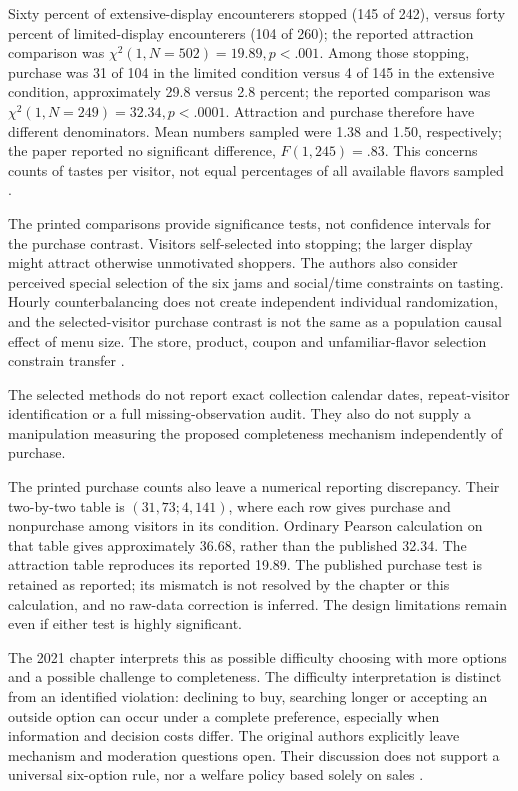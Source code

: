 Sixty percent of extensive-display encounterers stopped (145 of 242),
versus forty percent of limited-display encounterers (104 of 260);
the reported attraction comparison was
\(\chi^2(1,N=502)=19.89,p<.001\). Among those stopping, purchase
was 31 of 104 in the limited condition versus 4 of 145 in the extensive
condition, approximately 29.8 versus 2.8 percent; the reported comparison
was \(\chi^2(1,N=249)=32.34,p<.0001\). Attraction and purchase
therefore have different denominators. Mean numbers sampled were 1.38
and 1.50, respectively; the paper reported no significant difference,
\(F(1,245)=.83\). This concerns counts of tastes per visitor, not equal
percentages of all available flavors sampled
\cite[p.~997]{IyengarLepper2000ChoiceR94}.

The printed comparisons provide significance tests, not confidence intervals
for the purchase contrast. Visitors self-selected into stopping; the larger
display might attract otherwise unmotivated shoppers. The authors also
consider perceived special selection of the six jams and social/time
constraints on tasting. Hourly counterbalancing does not create independent
individual randomization, and the selected-visitor purchase contrast is
not the same as a population causal effect of menu size. The store,
product, coupon and unfamiliar-flavor selection constrain transfer
\cite[pp.~997--998, 1003--1004]{IyengarLepper2000ChoiceR94}.

The selected methods do not report exact collection calendar dates,
repeat-visitor identification or a full missing-observation audit. They
also do not supply a manipulation measuring the proposed completeness
mechanism independently of purchase.

The printed purchase counts also leave a numerical reporting discrepancy.
Their two-by-two table is \((31,73;4,141)\), where each row gives
purchase and nonpurchase among visitors in its condition. Ordinary Pearson
calculation on that table gives approximately 36.68, rather than the
published 32.34. The attraction table reproduces its reported 19.89.
The published purchase test is retained as reported; its mismatch is not
resolved by the chapter or this calculation, and no raw-data correction
is inferred. The design limitations remain even if either test is highly
significant.

The 2021 chapter interprets this as possible difficulty choosing with more
options and a possible challenge to completeness. The difficulty interpretation
is distinct from an identified violation: declining to buy, searching longer
or accepting an outside option can occur under a complete preference,
especially when information and decision costs differ. The original authors
explicitly leave mechanism and moderation questions open. Their discussion
does not support a universal six-option rule, nor a welfare policy based
solely on sales \cite[p.~570]{DhamiAlNowaihi2021Economics}
\cite[pp.~998, 1003--1004]{IyengarLepper2000ChoiceR94}.


